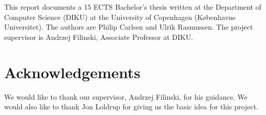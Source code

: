 
This report documents a 15 ECTS Bachelor's thesis written at the Department of
Computer Science (DIKU) at the University of Copenhagen (Københavns
Universitet). The authors are Philip Carlsen and Ulrik Rasmussen. The
project supervisor is Andrzej Filinski, Associate Professor at DIKU.


\section{Acknowledgements}

We would like to thank our supervisor, Andrzej Filinski, for his guidance. We
would also like to thank Jon Loldrup for giving us the basic idea for this
project.
